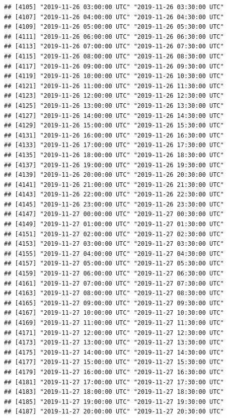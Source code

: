 \documentclass{article}\usepackage[]{graphicx}\usepackage[]{color}
\makeatletter
\newenvironment{kframe}{%
 \def\at@end@of@kframe{}%
 \ifinner\ifhmode%
  \def\at@end@of@kframe{\end{minipage}}%
  \begin{minipage}{\columnwidth}%
 \fi\fi%
 \def\FrameCommand##1{\hskip\@totalleftmargin \hskip-\fboxsep
 \colorbox{shadecolor}{##1}\hskip-\fboxsep
     \hskip-\linewidth \hskip-\@totalleftmargin \hskip\columnwidth}%
 \MakeFramed {\advance\hsize-\width
   \@totalleftmargin\z@ \linewidth\hsize
   \@setminipage}}%
 {\par\unskip\endMakeFramed%
 \at@end@of@kframe}
\newenvironment{knitrout}{}{} %
\makeatother
\begin{document}
\begin{knitrout}
\begin{kframe}
\begin{verbatim}
## [4105] "2019-11-26 03:00:00 UTC" "2019-11-26 03:30:00 UTC"
## [4107] "2019-11-26 04:00:00 UTC" "2019-11-26 04:30:00 UTC"
## [4109] "2019-11-26 05:00:00 UTC" "2019-11-26 05:30:00 UTC"
## [4111] "2019-11-26 06:00:00 UTC" "2019-11-26 06:30:00 UTC"
## [4113] "2019-11-26 07:00:00 UTC" "2019-11-26 07:30:00 UTC"
## [4115] "2019-11-26 08:00:00 UTC" "2019-11-26 08:30:00 UTC"
## [4117] "2019-11-26 09:00:00 UTC" "2019-11-26 09:30:00 UTC"
## [4119] "2019-11-26 10:00:00 UTC" "2019-11-26 10:30:00 UTC"
## [4121] "2019-11-26 11:00:00 UTC" "2019-11-26 11:30:00 UTC"
## [4123] "2019-11-26 12:00:00 UTC" "2019-11-26 12:30:00 UTC"
## [4125] "2019-11-26 13:00:00 UTC" "2019-11-26 13:30:00 UTC"
## [4127] "2019-11-26 14:00:00 UTC" "2019-11-26 14:30:00 UTC"
## [4129] "2019-11-26 15:00:00 UTC" "2019-11-26 15:30:00 UTC"
## [4131] "2019-11-26 16:00:00 UTC" "2019-11-26 16:30:00 UTC"
## [4133] "2019-11-26 17:00:00 UTC" "2019-11-26 17:30:00 UTC"
## [4135] "2019-11-26 18:00:00 UTC" "2019-11-26 18:30:00 UTC"
## [4137] "2019-11-26 19:00:00 UTC" "2019-11-26 19:30:00 UTC"
## [4139] "2019-11-26 20:00:00 UTC" "2019-11-26 20:30:00 UTC"
## [4141] "2019-11-26 21:00:00 UTC" "2019-11-26 21:30:00 UTC"
## [4143] "2019-11-26 22:00:00 UTC" "2019-11-26 22:30:00 UTC"
## [4145] "2019-11-26 23:00:00 UTC" "2019-11-26 23:30:00 UTC"
## [4147] "2019-11-27 00:00:00 UTC" "2019-11-27 00:30:00 UTC"
## [4149] "2019-11-27 01:00:00 UTC" "2019-11-27 01:30:00 UTC"
## [4151] "2019-11-27 02:00:00 UTC" "2019-11-27 02:30:00 UTC"
## [4153] "2019-11-27 03:00:00 UTC" "2019-11-27 03:30:00 UTC"
## [4155] "2019-11-27 04:00:00 UTC" "2019-11-27 04:30:00 UTC"
## [4157] "2019-11-27 05:00:00 UTC" "2019-11-27 05:30:00 UTC"
## [4159] "2019-11-27 06:00:00 UTC" "2019-11-27 06:30:00 UTC"
## [4161] "2019-11-27 07:00:00 UTC" "2019-11-27 07:30:00 UTC"
## [4163] "2019-11-27 08:00:00 UTC" "2019-11-27 08:30:00 UTC"
## [4165] "2019-11-27 09:00:00 UTC" "2019-11-27 09:30:00 UTC"
## [4167] "2019-11-27 10:00:00 UTC" "2019-11-27 10:30:00 UTC"
## [4169] "2019-11-27 11:00:00 UTC" "2019-11-27 11:30:00 UTC"
## [4171] "2019-11-27 12:00:00 UTC" "2019-11-27 12:30:00 UTC"
## [4173] "2019-11-27 13:00:00 UTC" "2019-11-27 13:30:00 UTC"
## [4175] "2019-11-27 14:00:00 UTC" "2019-11-27 14:30:00 UTC"
## [4177] "2019-11-27 15:00:00 UTC" "2019-11-27 15:30:00 UTC"
## [4179] "2019-11-27 16:00:00 UTC" "2019-11-27 16:30:00 UTC"
## [4181] "2019-11-27 17:00:00 UTC" "2019-11-27 17:30:00 UTC"
## [4183] "2019-11-27 18:00:00 UTC" "2019-11-27 18:30:00 UTC"
## [4185] "2019-11-27 19:00:00 UTC" "2019-11-27 19:30:00 UTC"
## [4187] "2019-11-27 20:00:00 UTC" "2019-11-27 20:30:00 UTC"

\end{verbatim}
\end{kframe}
\end{knitrout}
\end{document}
